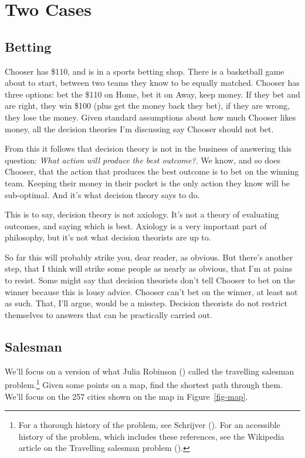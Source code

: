 \documentclass[
  12pt,
  letterpaper,
  DIV=11,
  numbers=noendperiod,
  twoside]{scrartcl}
\begin{document}
\section{Two Cases}\label{two-cases}

\subsection{Betting}\label{betting}

Chooser has \$110, and is in a sports betting shop. There is a
basketball game about to start, between two teams they know to be
equally matched. Chooser has three options: bet the \$110 on Home, bet
it on Away, keep money. If they bet and are right, they win \$100 (plus
get the money back they bet), if they are wrong, they lose the money.
Given standard assumptions about how much Chooser likes money, all the
decision theories I'm discussing say Chooser should not bet.

From this it follows that decision theory is not in the business of
answering this question: \emph{What action will produce the best
outcome?}. We know, and so does Chooser, that the action that produces
the best outcome is to bet on the winning team. Keeping their money in
their pocket is the only action they know will be sub-optimal. And it's
what decision theory says to do.

This is to say, decision theory is not axiology. It's not a theory of
evaluating outcomes, and saying which is best. Axiology is a very
important part of philosophy, but it's not what decision theorists are
up to.

So far this will probably strike you, dear reader, as obvious. But
there's another step, that I think will strike some people as nearly as
obvious, that I'm at pains to resist. Some might say that decision
theorists don't tell Chooser to bet on the winner because this is lousy
advice. Chooser can't bet on the winner, at least not as such. That,
I'll argue, would be a misstep. Decision theorists do not restrict
themselves to answers that can be practically carried out.

\subsection{Salesman}\label{salesman}

We'll focus on a version of what Julia Robinson
() called the travelling salesman
problem.\footnote{For a thorough history of the problem, see Schrijver
  (). For an accessible history of the
  problem, which includes these references, see the Wikipedia article on
  the Travelling salesman problem ().}
Given some points on a map, find the shortest path through them. We'll
focus on the 257 cities shown on the map in Figure~\ref{fig-map}.
\end{document}
